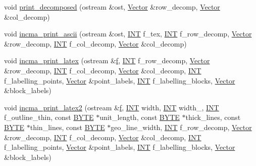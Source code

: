 \begin{DoxyCompactItemize}
\item 
void \mbox{\hyperlink{classmatrix_afd1ff3d3d7b507287af6891d94771bab}{print\+\_\+decomposed}} (ostream \&ost, \mbox{\hyperlink{class_vector}{Vector}} \&row\+\_\+decomp, \mbox{\hyperlink{class_vector}{Vector}} \&col\+\_\+decomp)
\item 
void \mbox{\hyperlink{classmatrix_a1eba80b1e47f3672e6880e7343eea8e4}{incma\+\_\+print\+\_\+ascii}} (ostream \&ost, \mbox{\hyperlink{galois_8h_a09fddde158a3a20bd2dcadb609de11dc}{I\+NT}} f\+\_\+tex, \mbox{\hyperlink{galois_8h_a09fddde158a3a20bd2dcadb609de11dc}{I\+NT}} f\+\_\+row\+\_\+decomp, \mbox{\hyperlink{class_vector}{Vector}} \&row\+\_\+decomp, \mbox{\hyperlink{galois_8h_a09fddde158a3a20bd2dcadb609de11dc}{I\+NT}} f\+\_\+col\+\_\+decomp, \mbox{\hyperlink{class_vector}{Vector}} \&col\+\_\+decomp)
\item 
void \mbox{\hyperlink{classmatrix_a2f3ef897e502a22def6b90a7c02addf5}{incma\+\_\+print\+\_\+latex}} (ostream \&\mbox{\hyperlink{alphabet2_8_c_a362077c979b0bb65159c603270e40f70}{f}}, \mbox{\hyperlink{galois_8h_a09fddde158a3a20bd2dcadb609de11dc}{I\+NT}} f\+\_\+row\+\_\+decomp, \mbox{\hyperlink{class_vector}{Vector}} \&row\+\_\+decomp, \mbox{\hyperlink{galois_8h_a09fddde158a3a20bd2dcadb609de11dc}{I\+NT}} f\+\_\+col\+\_\+decomp, \mbox{\hyperlink{class_vector}{Vector}} \&col\+\_\+decomp, \mbox{\hyperlink{galois_8h_a09fddde158a3a20bd2dcadb609de11dc}{I\+NT}} f\+\_\+labelling\+\_\+points, \mbox{\hyperlink{class_vector}{Vector}} \&point\+\_\+labels, \mbox{\hyperlink{galois_8h_a09fddde158a3a20bd2dcadb609de11dc}{I\+NT}} f\+\_\+labelling\+\_\+blocks, \mbox{\hyperlink{class_vector}{Vector}} \&block\+\_\+labels)
\item 
void \mbox{\hyperlink{classmatrix_a6e282efff2dd195d9aaf94343768106d}{incma\+\_\+print\+\_\+latex2}} (ostream \&\mbox{\hyperlink{alphabet2_8_c_a362077c979b0bb65159c603270e40f70}{f}}, \mbox{\hyperlink{galois_8h_a09fddde158a3a20bd2dcadb609de11dc}{I\+NT}} width, \mbox{\hyperlink{galois_8h_a09fddde158a3a20bd2dcadb609de11dc}{I\+NT}} width\+\_, \mbox{\hyperlink{galois_8h_a09fddde158a3a20bd2dcadb609de11dc}{I\+NT}} f\+\_\+outline\+\_\+thin, const \mbox{\hyperlink{galois_8h_ab6cc7b4aeb6ea31aba2b3fbfc83ff5e6}{B\+Y\+TE}} $\ast$unit\+\_\+length, const \mbox{\hyperlink{galois_8h_ab6cc7b4aeb6ea31aba2b3fbfc83ff5e6}{B\+Y\+TE}} $\ast$thick\+\_\+lines, const \mbox{\hyperlink{galois_8h_ab6cc7b4aeb6ea31aba2b3fbfc83ff5e6}{B\+Y\+TE}} $\ast$thin\+\_\+lines, const \mbox{\hyperlink{galois_8h_ab6cc7b4aeb6ea31aba2b3fbfc83ff5e6}{B\+Y\+TE}} $\ast$geo\+\_\+line\+\_\+width, \mbox{\hyperlink{galois_8h_a09fddde158a3a20bd2dcadb609de11dc}{I\+NT}} f\+\_\+row\+\_\+decomp, \mbox{\hyperlink{class_vector}{Vector}} \&row\+\_\+decomp, \mbox{\hyperlink{galois_8h_a09fddde158a3a20bd2dcadb609de11dc}{I\+NT}} f\+\_\+col\+\_\+decomp, \mbox{\hyperlink{class_vector}{Vector}} \&col\+\_\+decomp, \mbox{\hyperlink{galois_8h_a09fddde158a3a20bd2dcadb609de11dc}{I\+NT}} f\+\_\+labelling\+\_\+points, \mbox{\hyperlink{class_vector}{Vector}} \&point\+\_\+labels, \mbox{\hyperlink{galois_8h_a09fddde158a3a20bd2dcadb609de11dc}{I\+NT}} f\+\_\+labelling\+\_\+blocks, \mbox{\hyperlink{class_vector}{Vector}} \&block\+\_\+labels)

\end{DoxyCompactItemize}
